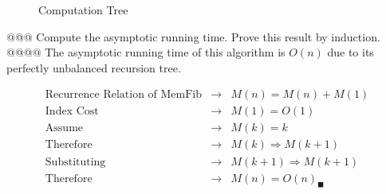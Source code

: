 \documentclass[10pt]{article}
\begin{document}
\begin{easylist}[enumerate]
    \begin{figure}[!ht]
        \centering
        \caption{Computation Tree}
        \label{fig:tree}
    \end{figure}

    @@@ Compute the asymptotic running time. Prove this result by induction.
    @@@@ The asymptotic running time of this algorithm is $O(n)$ due to its perfectly unbalanced recursion tree.

        \[ \begin{aligned}
            \text{Recurrence Relation of MemFib} &\to& M(n) = M(n) + M(1)\\
            \text{Index Cost} &\to& M(1) = O(1)\\
            \text{Assume} &\to& M(k) = k\\
            \text{Therefore} &\to& M(k) \Rightarrow M(k + 1)\\
            \text{Substituting} &\to& M(k + 1) \Rightarrow M(k + 1)\\
            \text{Therefore} &\to& M(n) = {O(n)}_\blacksquare
        \end{aligned} \]


\end{easylist}
\end{document}
